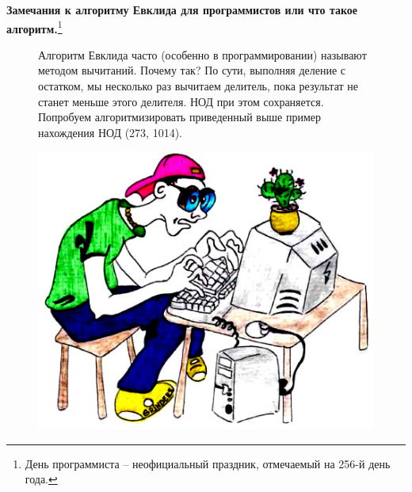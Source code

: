 \begin{center}
    \textbf{Замечания к алгоритму Евклида для программистов или что такое алгоритм.}\footnote{День программиста – неофициальный праздник, отмечаемый на 256-й день года. \smiley}
\end{center}

\begin{figure}[H]
    \begin{minipage}{0.65\linewidth}
        Алгоритм Евклида часто (особенно в программировании) называют методом вычитаний. Почему так? По сути, выполняя деление с остатком, мы несколько раз вычитаем делитель, пока результат не станет меньше этого делителя. НОД при этом сохраняется. Попробуем алгоритмизировать приведенный выше пример нахождения НОД (273, 1014).
    \end{minipage}
\hfill
    \begin{minipage}{0.29\linewidth}
        \includegraphics[width=0.95\columnwidth]{img/11.3 img2.png}
    \end{minipage}
\end{figure}


